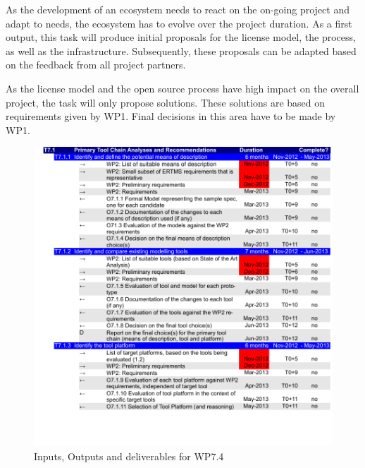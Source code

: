 \documentclass{template/openetcs_article}
\begin{document}
As the development of an ecosystem needs to react on the on-going project and adapt to needs, the ecosystem has to evolve over the project duration. As a first output, this task will produce initial proposals for the license model, the process, as well as the infrastructure. Subsequently, these proposals can be adapted based on the feedback from all project partners.

As the license model and the open source process have high impact on the overall project, the task will only propose solutions. These solutions are based on requirements given by WP1. Final decisions in this area have to be made by WP1. 

\begin{figure}[!ht]
	\begin{center}
	\includegraphics[width=\textwidth,page=4]{project_plan/WP7_Project_Management.pdf}
	\caption{Inputs, Outputs and deliverables for WP7.4}
	\label{fig:wrspm}
	\end{center}
\end{figure}
\end{document}
